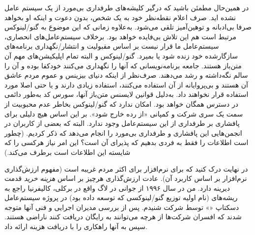 در همین‌حال مطمئن باشید که درگیر کلیشه‌های طرفداری بی‌مورد از یک سیستم عامل نشده اید.
صرف اعلام نقطه‌نظر خود به یک شخص، بدون دعوت و اینکه او بخواهد صرفا بی‌ادبانه و توهین‌آمیز
تلقی می‌شود. به‌علاوه زمانی‌ که این موضوع به گنو/لینوکس مرتبط است هم این تلاش بی‌فایده خواهد بود.
برخلاف سیستم‌عامل‌های انحصاری، سیستم‌عامل ما قرار نیست بر اساس مقبولیت و انتشار/نگهداری
برنامه‌های سازگارشده خود زنده شود یا بمیرد.
گنو/لینوکس و البته تمام اپلیکیشن‌های مهم آن متن‌باز هستند. جامعه برنامه‌نویسانی که آنها
را نگهداری می‌کنند خودکفا بوده و آن را سالم نگه‌داشته و رشد می‌دهند.
صرف‌نظر از اینکه دنیای بیزینس و عموم مردم عاشق آن هستند و بی‌پروایانه از آن استفاده می‌کنند،
استفاده زیادی دارند و یا حتی اصلا مورد استفاده قرار نخواهند داد.
به‌دلیل قوانین لایسنس متن‌باز آنها، سورس کد به‌طور دائمی در دسترس همگان خواهد بود.
امکان ندارد که گنو/لینوکس بخاطر عدم محبوبیت از سمت یک سری شرکت و کمپانی
«از رده خارج شود». بر این اساس هیچ دلیلی برای پافشاری بر طرفداری از این سیستم‌عامل
وجود ندارد. البته که بعضی از کاربران در انجمن‌هایی این پافشاری و طرفداری بی‌مورد را
انجام می‌دهد که ذکر کردیم. (چطور است اطلاعات را فقط به فردی بدهیم که پذیرای آن است؟
این امر نیاز هرکسی را که شایسته این اطلاعات است برطرف می‌کند.)

در نهایت درک کنید که
برای نرم‌افزار برای اکثر مردم غریبه است (مفهوم ارزش‌گذاری نرم‌افزار بر اساس کاربرد آن).
عادت ارزش‌گذاری هرچیز بر اساس
{\itshape هزینه خرید}
قدمت دیرینه دارد.
من در سال ۱۹۹۶ از جوانی در لاگ واقع در برکلی، کالیفرنیا راجع به ریشه‌های
(نام اولیه توزیع گنو/لینوکسی که توسعه داده بود) در پروژه
سیستم‌عامل دسکتاپ «» توسط شرکت  شنیدم.
پس از بررسی مدیران اجرایی و فنی آنها متوجه شدند که افسران شرکت‌ها
از هرچه می‌توانند به رایگان دریافت کنند ناراضی هستند. سپس 
به آنها راهکاری را با دریافت هزینه ارائه داد.

